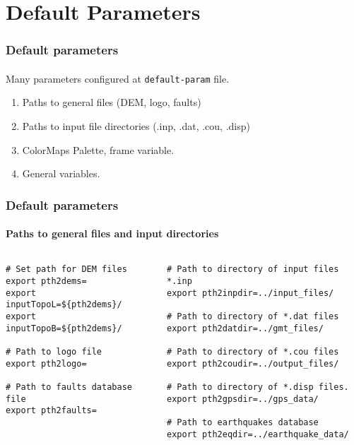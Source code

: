 \section[Defaults]{Default Parameters}

\graphicspath{{Chapter3/Figs/Vector/}}

\begin{frame}
  \frametitle{Default parameters}
  \framesubtitle{}
  \label{fr3:frank_tr}
  
Many parameters configured at \texttt{default-param} file. 
\begin{enumerate}
\item  Paths to general files (DEM, logo, faults) 
\item Paths to input file directories (.inp, .dat, .cou, .disp) 
\item ColorMaps Palette, frame variable. 
\item General variables.
\end{enumerate}
\end{frame}
\note{} %

\begin{frame}[t,fragile]
  \frametitle{Default parameters}
  \framesubtitle{Paths to general files and input directories}
  \label{fr3:frank_tr}
\begin{columns}[t]
  \begin{column}{.45\textwidth}
	\begin{scriptsize}
	  \begin{verbatim}
# Set path for DEM files
export pth2dems=
export inputTopoL=${pth2dems}/
export inputTopoB=${pth2dems}/

# Path to logo file
export pth2logo=

# Path to faults database file
export pth2faults=
\end{verbatim}
    \end{scriptsize}
  \end{column}
  \begin{column}{.54\textwidth}
\begin{scriptsize}
	\begin{verbatim}
# Path to directory of input files *.inp
export pth2inpdir=../input_files/

# Path to directory of *.dat files
export pth2datdir=../gmt_files/

# Path to directory of *.cou files
export pth2coudir=../output_files/

# Path to directory of *.disp files.
export pth2gpsdir=../gps_data/

# Path to earthquakes database
export pth2eqdir=../earthquake_data/
\end{verbatim}	  
	\end{scriptsize}
  \end{column}
\end{columns}
\end{frame}
\note{} %


